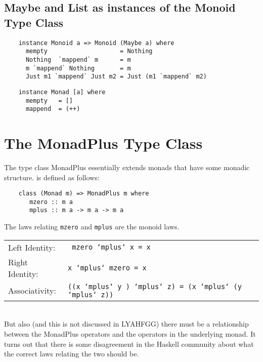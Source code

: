 \documentclass[11pt]{article}
\begin{document}
\subsection{Maybe and List as instances of the Monoid Type Class}

\begin{verbatim}
    instance Monoid a => Monoid (Maybe a) where
      mempty                    = Nothing
      Nothing  `mappend` m      = m
      m `mappend` Nothing       = m  
      Just m1 `mappend` Just m2 = Just (m1 `mappend` m2)  
\end{verbatim}

\begin{verbatim}
    instance Monad [a] where
      mempty   = []
      mappend  = (++)
\end{verbatim}

\section{The MonadPlus Type Class}

The type class MonadPlus essentially extends monads that have some monadic structure. 
is defined as follows:


\begin{verbatim}
    class (Monad m) => MonadPlus m where
       mzero :: m a
       mplus :: m a -> m a -> m a
\end{verbatim}

\noindent{}The laws relating {\tt{mzero}} and {\tt{mplus}} are the monoid laws.\\

\begin{tabular}{ll}
Left Identity: & {\tt{ mzero `mplus` x =  x}} \\
Right Identity: & {\tt{x `mplus` mzero = x}} \\
Associativity: & {\tt{((x `mplus` y ) `mplus` z) = (x `mplus` (y `mplus` z))}} \\
\end{tabular} \vspace{.125in}\\

But also (and this is not discussed in LYAHFGG) there must be a relationship
between the MonadPlus operators and the operators in the underlying monad.  It
turns out that there is some disagreement in the Haskell community about what
the correct laws relating the two should be.
\end{document}
